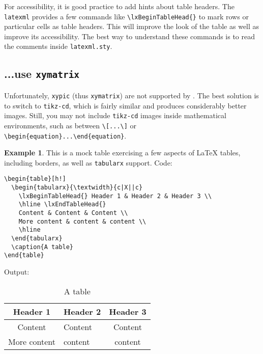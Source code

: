 \documentclass[a4paper]{article}
\def\ltxinline{\lstinline[style=latexml,frame=none]}
\theoremstyle{definition}
\newtheorem{exa}{Example}[subsection]
\begin{document}
  For accessibility, it is good practice to add hints about table headers. The \verb|latexml| provides a few commands like \ltxinline|\lxBeginTableHead{}| to mark rows or particular cells as table headers. This will improve the look of the \HTML{} table as well as improve its accessibility. The best way to understand these commands is to read the comments inside \verb|latexml.sty|.

\subsection{...use \texttt{xymatrix}}
Unfortunately, \verb|xypic| (thus \verb|xymatrix|) are not supported by \LaTeXML{}. The best solution is to switch to \verb|tikz-cd|, which is fairly similar and produces considerably better images. Still, you may not include \verb|tikz-cd| images inside mathematical environments, such as between \ltxinline|\[...\]| or \ltxinline|\begin{equation}...\end{equation}|.

\begin{exa}
  This is a mock table exercising a few aspects of \LaTeX{} tables, including borders, as well as \verb|tabularx| support.
  Code:
  \begin{lstlisting}[style=latexml]
\begin{table}[h!]
  \begin{tabularx}{\textwidth}{c|X||c}
    \lxBeginTableHead{} Header 1 & Header 2 & Header 3 \\
    \hline \lxEndTableHead{}
    Content & Content & Content \\
    More content & content & content \\
    \hline
  \end{tabularx}
  \caption{A table}
\end{table}
  \end{lstlisting}
  Output:
  \begin{table}[h!]
    \begin{tabularx}{\textwidth}{c|X||c}
      \lxBeginTableHead{} Header 1 & Header 2 & Header 3 \\
      \hline \lxEndTableHead{}
      Content & Content & Content \\
      More content & content & content \\
      \hline
    \end{tabularx}
    \caption{A table}
  \end{table}
\end{exa}
\end{document}
